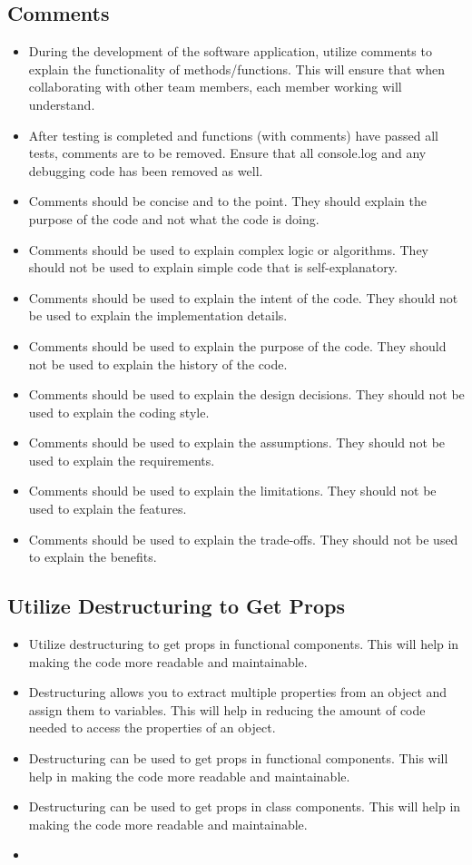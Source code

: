 \documentclass{article}
\begin{document}
\subsection{Comments}
\begin{itemize}
    \item During the development of the software application, utilize comments to explain the functionality of methods/functions. This will ensure that when collaborating with other team members, each member working will understand.
    \item After testing is completed and functions (with comments) have passed all tests, comments are to be removed. Ensure that all console.log and any debugging code has been removed as well.
    \item Comments should be concise and to the point. They should explain the purpose of the code and not what the code is doing.
    \item Comments should be used to explain complex logic or algorithms. They should not be used to explain simple code that is self-explanatory.
    \item Comments should be used to explain the intent of the code. They should not be used to explain the implementation details.
    \item Comments should be used to explain the purpose of the code. They should not be used to explain the history of the code.
    \item Comments should be used to explain the design decisions. They should not be used to explain the coding style.
    \item Comments should be used to explain the assumptions. They should not be used to explain the requirements.
    \item Comments should be used to explain the limitations. They should not be used to explain the features.
    \item Comments should be used to explain the trade-offs. They should not be used to explain the benefits.
\end{itemize}

\subsection{Utilize Destructuring to Get Props}
\begin{itemize}
    \item Utilize destructuring to get props in functional components. This will help in making the code more readable and maintainable.
    \item Destructuring allows you to extract multiple properties from an object and assign them to variables. This will help in reducing the amount of code needed to access the properties of an object.
    \item Destructuring can be used to get props in functional components. This will help in making the code more readable and maintainable.
    \item Destructuring can be used to get props in class components. This will help in making the code more readable and maintainable.
    \item 
\end{itemize}
\end{document}
